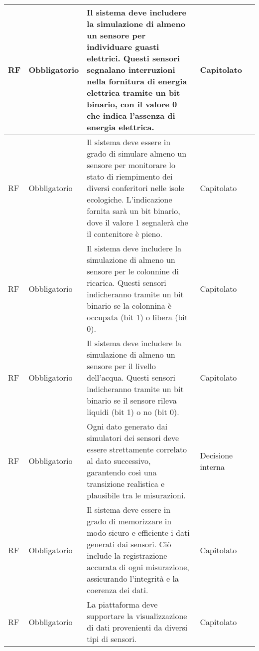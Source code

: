 \begin{longtable}{|C{1.5cm}|C{2cm}|L{5cm}|C{2cm}|C{1.5cm}|}
    \hline
     RF & Obbligatorio &  Il sistema deve includere la simulazione di almeno un sensore per individuare guasti elettrici. Questi sensori segnalano interruzioni nella fornitura di energia elettrica tramite un bit binario, con il valore 0 che indica l'assenza di energia elettrica. & Capitolato & \\
    
    \hline
     RF & Obbligatorio &  Il sistema deve essere in grado di simulare almeno un sensore per monitorare lo stato di riempimento dei diversi conferitori nelle isole ecologiche. L'indicazione fornita sarà un bit binario, dove il valore 1 segnalerà che il contenitore è pieno. & Capitolato & \\
    
    \hline
     RF & Obbligatorio &  Il sistema deve includere la simulazione di almeno un sensore per le colonnine di ricarica. Questi sensori indicheranno tramite un bit binario se la colonnina è occupata (bit 1) o libera (bit 0). & Capitolato &  \\
    
    \hline
     RF & Obbligatorio &  Il sistema deve includere la simulazione di almeno un sensore per il livello dell'acqua. Questi sensori indicheranno tramite un bit binario se il sensore rileva liquidi  (bit 1) o no (bit 0). & Capitolato &  \\
    
    \hline
     RF & Obbligatorio &  Ogni dato generato dai simulatori dei sensori deve essere strettamente correlato al dato successivo, garantendo così una transizione realistica e plausibile tra le misurazioni. & Decisione interna & \\
    
    \hline
     RF & Obbligatorio & Il sistema deve essere in grado di memorizzare in modo sicuro e efficiente i dati generati dai sensori. Ciò include la registrazione accurata di ogni misurazione, assicurando l'integrità e la coerenza dei dati. & Capitolato & \\
    
    \hline
     RF & Obbligatorio & La piattaforma deve supportare la visualizzazione di dati provenienti da diversi tipi di sensori. & Capitolato & \\
    

\end{longtable}
